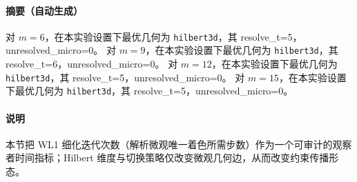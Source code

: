 \paragraph{摘要（自动生成）}
对 $m=6$，在本实验设置下最优几何为 \texttt{hilbert3d}，其 resolve\_t=5，unresolved\_micro=0。
对 $m=9$，在本实验设置下最优几何为 \texttt{hilbert3d}，其 resolve\_t=6，unresolved\_micro=0。
对 $m=12$，在本实验设置下最优几何为 \texttt{hilbert3d}，其 resolve\_t=5，unresolved\_micro=0。
对 $m=15$，在本实验设置下最优几何为 \texttt{hilbert3d}，其 resolve\_t=5，unresolved\_micro=0。
\paragraph{说明}
本节把 WL1 细化迭代次数（解析微观唯一着色所需步数）作为一个可审计的观察者时间指标；Hilbert 维度与切换策略仅改变微观几何边，从而改变约束传播形态。
